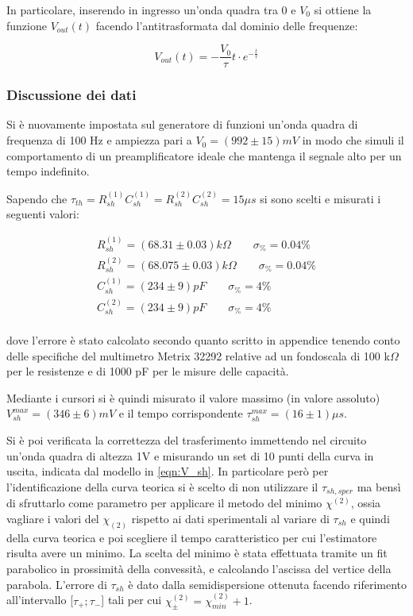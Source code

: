 \documentclass{article}
\begin{document}
In particolare, inserendo in ingresso un'onda quadra tra 0 e $V_0$ si ottiene la funzione $V_{out}(t)$ facendo l'antitrasformata 
dal dominio delle frequenze:

\begin{equation}
    \label{eqn:V_sh}
    V_{out}(t)= - \frac{V_0}{\tau} t \cdot e^{-\frac{t}{\tau}}
\end{equation}
    

\subsubsection{Discussione dei dati}
Si è nuovamente impostata sul generatore di funzioni un'onda quadra di frequenza di 100 Hz e ampiezza pari a $V_{0}=(992 \pm 15)mV$
in modo che simuli il comportamento di un preamplificatore ideale che mantenga il segnale alto per un tempo indefinito.

Sapendo che $\tau_{th}=R_{sh}^{(1)} C_{sh}^{(1)} = R_{sh}^{(2)} C_{sh}^{(2)}=15 \mu s$ si sono scelti e misurati i seguenti valori:

\begin{align*}
R_{sh}^{(1)} = (68.31  \pm 0.03)k\Omega \quad\quad \sigma_{\%}=  0.04 \% \\
R_{sh}^{(2)} = (68.075  \pm 0.03)k\Omega \quad\quad \sigma_{\%}=  0.04\% \\
C_{sh}^{(1)}= (234 \pm  9)pF \quad\quad \sigma_{\%}= 4 \% \\
C_{sh}^{(2)}= (234 \pm  9)pF \quad\quad \sigma_{\%}= 4 \% \\
\end{align*}

dove l'errore è stato calcolato secondo quanto scritto in appendice tenendo conto delle specifiche del multimetro Metrix 32292 relative
ad un fondoscala di 100 k$\Omega$ per le resistenze e di 1000 pF per le misure delle capacità.

Mediante i cursori si è quindi misurato il valore massimo (in valore assoluto) $V_{sh}^{max}=(346 \pm 6)mV$ e il tempo corrispondente 
$\tau_{sh}^{max}=(16 \pm 1)\mu s$.

Si è poi verificata la correttezza del trasferimento immettendo nel circuito un'onda quadra di altezza 1V e misurando un set di 10 punti 
della curva in uscita, indicata dal modello in \ref{eqn:V_sh}. In particolare però per l'identificazione della curva teorica si è 
scelto di non utilizzare il $\tau_{sh,sper}$ ma bensì di sfruttarlo come parametro per applicare il metodo del minimo $\chi^{(2)}$, 
ossia vagliare i valori del $\chi_{(2)}$ rispetto ai dati sperimentali al variare di $\tau_{sh}$ e quindi
della curva teorica e poi scegliere il tempo caratteristico per cui l'estimatore risulta avere un minimo. 
La scelta del minimo è stata effettuata tramite un fit parabolico in prossimità della convessità, e calcolando l'ascissa del 
vertice della parabola.
L'errore di $\tau_{sh}$ è dato dalla semidispersione ottenuta facendo riferimento all'intervallo [$\tau_+ ; \tau_-$] 
tali per cui $\chi^{(2)}_{\pm} = \chi^{(2)}_{min} + 1$.
\end{document}
